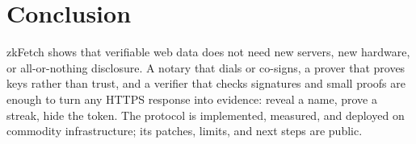 \documentclass[11pt,a4paper]{article}
\begin{document}
\section{Conclusion}

zkFetch shows that verifiable web data does not need new servers, new hardware,
or all-or-nothing disclosure.
A notary that dials or co-signs, a prover that proves keys rather than trust,
and a verifier that checks signatures and small proofs are enough to turn any
HTTPS response into evidence: reveal a name, prove a streak, hide the token.
The protocol is implemented, measured, and deployed on commodity infrastructure;
its patches, limits, and next steps are public.
\end{document}
